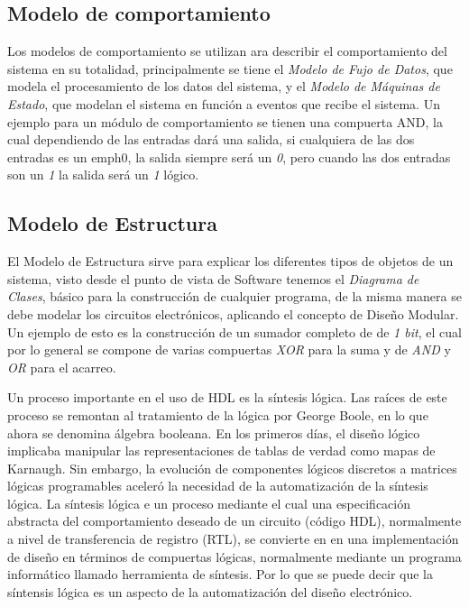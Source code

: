 \documentclass[journal]{IEEEtran}
\begin{document}
	\subsection{Modelo de comportamiento}
	Los modelos de comportamiento se utilizan ara describir el comportamiento del sistema en su totalidad, principalmente se tiene el \emph{Modelo de Fujo de Datos}, que modela el procesamiento de los datos del sistema, y el \emph{Modelo de Máquinas de Estado}, que modelan el sistema en función a eventos que recibe el sistema. Un ejemplo para un módulo de comportamiento se tienen una compuerta AND, la cual dependiendo de las entradas dará una salida, si cualquiera de las dos entradas es un emph{0}, la salida siempre será un \emph{0},  pero cuando las dos entradas son un \emph{1} la salida será un \emph{1} lógico.
	
	\subsection{Modelo de Estructura}
	El Modelo de Estructura sirve para explicar los diferentes tipos de objetos de un sistema, visto desde el punto de vista de Software tenemos el \emph{Diagrama de Clases}, básico para la construcción de cualquier programa, de la misma manera se debe modelar los circuitos electrónicos, aplicando el concepto de Diseño Modular.
	Un ejemplo de esto es la construcción de un sumador completo de de \emph{1 bit}, el cual por lo general se compone de varias compuertas \emph{XOR} para la suma y de \emph{AND} y \emph{OR} para el acarreo.
		
	\vspace{4mm}
	
	Un proceso importante en el uso de HDL es la síntesis lógica. Las raíces de este proceso se remontan al tratamiento de la lógica por George Boole, en lo que ahora se denomina álgebra booleana. En los primeros días, el diseño lógico implicaba manipular las representaciones de tablas de verdad como mapas de Karnaugh.
	Sin embargo, la evolución de componentes lógicos discretos a matrices lógicas programables aceleró la necesidad de la automatización de la síntesis lógica. 
	La síntesis lógica e un proceso mediante el cual una especificación abstracta del comportamiento deseado de un circuito (código HDL), normalmente a nivel de transferencia de registro (RTL), se convierte en en una implementación de diseño en términos de compuertas lógicas, normalmente mediante un programa informático llamado herramienta de síntesis.
	Por lo que se puede decir que la síntensis lógica es un aspecto de la automatización del diseño electrónico.
		
\end{document}
